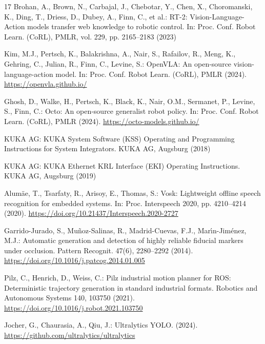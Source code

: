\documentclass{svproc}
\begin{document}
\begin{thebibliography}{17}
Brohan, A., Brown, N., Carbajal, J., Chebotar, Y., Chen, X., Choromanski, K., Ding, T., Driess, D., Dubey, A., Finn, C., et al.: RT-2: Vision-Language-Action models transfer web knowledge to robotic control. In: Proc. Conf. Robot Learn. (CoRL), PMLR, vol. 229, pp. 2165--2183 (2023)

Kim, M.J., Pertsch, K., Balakrishna, A., Nair, S., Rafailov, R., Meng, K., Gehring, C., Julian, R., Finn, C., Levine, S.: OpenVLA: An open-source vision-language-action model. In: Proc. Conf. Robot Learn. (CoRL), PMLR (2024). \url{https://openvla.github.io/}

Ghosh, D., Walke, H., Pertsch, K., Black, K., Nair, O.M., Sermanet, P., Levine, S., Finn, C.: Octo: An open-source generalist robot policy. In: Proc. Conf. Robot Learn. (CoRL), PMLR (2024). \url{https://octo-models.github.io/}

KUKA AG: KUKA System Software (KSS) Operating and Programming Instructions for System Integrators. KUKA AG, Augsburg (2018)

KUKA AG: KUKA Ethernet KRL Interface (EKI) Operating Instructions. KUKA AG, Augsburg (2019)

Alum{\"a}e, T., Tsarfaty, R., Arisoy, E., Thomas, S.: Vosk: Lightweight offline speech recognition for embedded systems. In: Proc. Interspeech 2020, pp. 4210--4214 (2020). \url{https://doi.org/10.21437/Interspeech.2020-2727}

Garrido-Jurado, S., Mu{\~n}oz-Salinas, R., Madrid-Cuevas, F.J., Mar{\'\i}n-Jim{\'e}nez, M.J.: Automatic generation and detection of highly reliable fiducial markers under occlusion. Pattern Recognit. 47(6), 2280--2292 (2014). \url{https://doi.org/10.1016/j.patcog.2014.01.005}

Pilz, C., Henrich, D., Weiss, C.: Pilz industrial motion planner for ROS: Deterministic trajectory generation in standard industrial formats. Robotics and Autonomous Systems 140, 103750 (2021). \url{https://doi.org/10.1016/j.robot.2021.103750}

Jocher, G., Chaurasia, A., Qiu, J.: Ultralytics YOLO. (2024). \url{https://github.com/ultralytics/ultralytics}

\end{thebibliography}

\newpage
\end{document}
